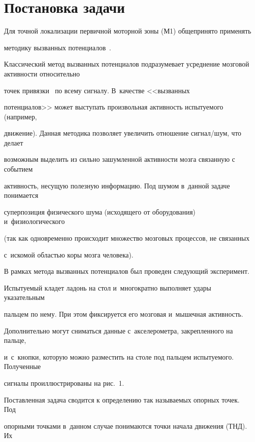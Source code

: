 \section{Постановка задачи}



Для точной локализации первичной моторной зоны (М1) общепринято применять 

методику вызванных потенциалов~\cite{method_vyzv_pot_2, method_vyzv_pot_1}. 

Классический метод вызванных потенциалов подразумевает усреднение мозговой активности  относительно 

точек привязки~\cite{method_vyzv_pot_1} по всему сигналу. В~качестве <<вызванных 

потенциалов>> может выступать произвольная активность испытуемого (например, 

движение). Данная методика позволяет увеличить отношение сигнал/шум, что делает 

возможным выделить из  сильно зашумленной активности мозга связанную с событием 

активность, несущую полезную информацию. Под шумом в~данной задаче понимается 

суперпозиция физического шума (исходящего от оборудования) и~физиологического 

(так как одновременно происходит множество мозговых процессов, не связанных 

с~искомой областью коры мозга человека).



В рамках метода вызванных потенциалов был проведен следующий эксперимент. 

Испытуемый кладет ладонь на стол и~многократно выполняет удары указательным 

пальцем по нему. При этом фиксируется его мозговая и~мышечная активность. 

Дополнительно могут сниматься данные с~акселерометра, закрепленного на пальце, 

и~с~кнопки, которую можно разместить на столе под пальцем испытуемого. Полученные 

сигналы проиллюстрированы на рис.~1.





Поставленная задача сводится к определению так называемых опорных точек. Под 

опорными точками в~данном случае понимаются точки начала движения (ТНД). Их 

